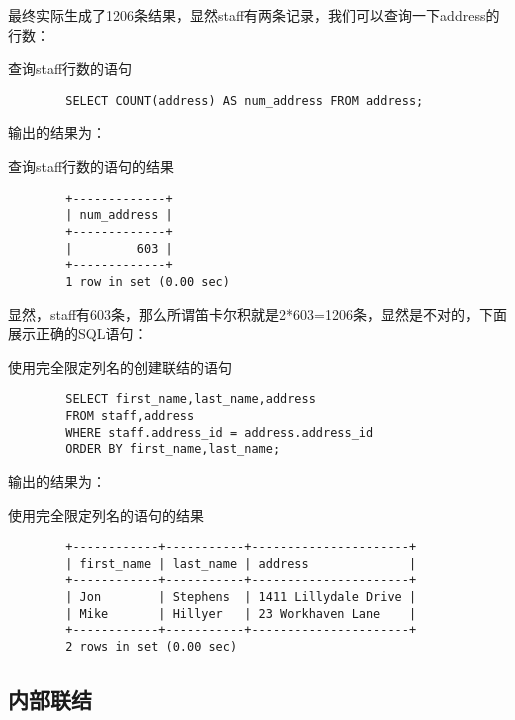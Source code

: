 \documentclass[UTF8]{article}
\begin{document}
最终实际生成了1206条结果，显然staff有两条记录，我们可以查询一下address的行数：

\begin{listing}[H]
        \caption{查询staff行数的语句}
	\label{code:selectstaffrowclause}
\begin{verbatim}
        SELECT COUNT(address) AS num_address FROM address;
\end{verbatim}
\end{listing}

输出的结果为：

\begin{listing}[H]
	\caption{查询staff行数的语句的结果}
	\label{code:selectstaffrowclauseresult}
\begin{verbatim}
        +-------------+
        | num_address |
        +-------------+
        |         603 |
        +-------------+
        1 row in set (0.00 sec)
\end{verbatim}
\end{listing}

显然，staff有603条，那么所谓笛卡尔积就是2*603=1206条，显然是不对的，下面展示正确的SQL语句：

\begin{listing}[H]
        \caption{使用完全限定列名的创建联结的语句}
	\label{code:rightcartesiancreatejoinclause}
\begin{verbatim}
        SELECT first_name,last_name,address 
        FROM staff,address 
        WHERE staff.address_id = address.address_id 
        ORDER BY first_name,last_name;
\end{verbatim}
\end{listing}

输出的结果为：

\begin{listing}[H]
	\caption{使用完全限定列名的语句的结果}
	\label{code:rightcartesiancreatejoinclauseresult}
\begin{verbatim}
        +------------+-----------+----------------------+
        | first_name | last_name | address              |
        +------------+-----------+----------------------+
        | Jon        | Stephens  | 1411 Lillydale Drive |
        | Mike       | Hillyer   | 23 Workhaven Lane    |
        +------------+-----------+----------------------+
        2 rows in set (0.00 sec)
\end{verbatim}
\end{listing}

\subsection{内部联结}
\end{document}
